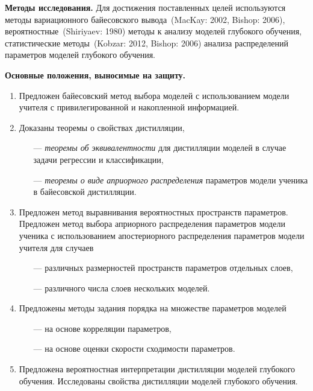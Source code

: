 \documentclass{dissert}
\begin{document}
\vspace{0.5cm}
\textbf{Методы исследования.} Для достижения поставленных целей используются методы вариационного байесовского вывода~(MacKay: 2002, Bishop: 2006), вероятностные~(Shiriyaev: 1980) методы к анализу моделей глубокого обучения, статистические методы~(Kobzar: 2012, Bishop: 2006) анализа распределений параметров моделей глубокого обучения.

\vspace{0.5cm}
\textbf{Основные положения, выносимые на защиту.}
\vspace{0.3cm}
\begin{enumerate}
    \item Предложен байесовский метод выбора моделей с использованием модели учителя с привилегированной и накопленной информацией.
    \item Доказаны теоремы о свойствах дистилляции, 
    \begin{itemize}
        \item[---] \emph{теоремы об эквивалентности} для дистилляции моделей в случае задачи регрессии и классификации,
        \item[---] \emph{теоремы о виде априорного распределения} параметров модели ученика в байесовской дистилляции.
    \end{itemize}
    \item Предложен метод выравнивания вероятностных пространств параметров. Предложен метод выбора априорного распределения параметров модели ученика с использованием апостериорного распределения параметров модели учителя для случаев
    \begin{itemize}
        \item[---] различных размерностей пространств параметров отдельных слоев,
        \item[---] различного числа слоев нескольких моделей.
    \end{itemize}
    \item Предложены методы задания порядка на множестве параметров моделей
    \begin{itemize}
        \item[---] на основе корреляции параметров,
        \item[---] на основе оценки скорости сходимости параметров.
    \end{itemize}
    \item Предложена вероятностная интерпретации дистилляции моделей глубокого обучения. Исследованы свойства дистилляции моделей глубокого обучения.
\end{enumerate}
\end{document}
